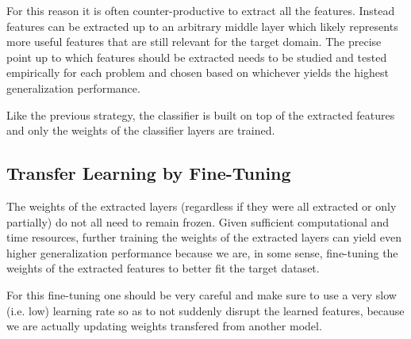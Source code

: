 For this reason it is often counter-productive to extract all the features. Instead features can be extracted up to an arbitrary middle layer which likely represents more useful features that are still relevant for the target domain. The precise point up to which features should be extracted needs to be studied and tested empirically for each problem and chosen based on whichever yields the highest generalization performance.

Like the previous strategy, the classifier is built on top of the extracted features and only the weights of the classifier layers are trained.

\subsection{Transfer Learning by Fine-Tuning}

The weights of the extracted layers (regardless if they were all extracted or only partially) do not all need to remain frozen. Given sufficient computational and time resources, further training the weights of the extracted layers can yield even higher generalization performance because we are, in some sense, fine-tuning the weights of the extracted features to better fit the target dataset.

For this fine-tuning one should be very careful and make sure to use a very slow (i.e. low) learning rate so as to not suddenly disrupt the learned features, because we are actually updating weights transfered from another model.
